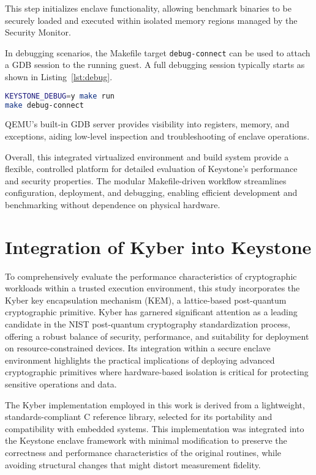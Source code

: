 This step initializes enclave functionality, allowing benchmark binaries to be securely loaded and executed within isolated memory regions managed by the Security Monitor.

In debugging scenarios, the Makefile target \texttt{debug-connect} can be used to attach a GDB session to the running guest. A full debugging session typically starts as shown in Listing~\ref{lst:debug}.

\begin{lstlisting}[language=bash, label={lst:debug}, caption={Starting a QEMU session with GDB debugging enabled}]
KEYSTONE_DEBUG=y make run
make debug-connect
\end{lstlisting}

QEMU’s built-in GDB server provides visibility into registers, memory, and exceptions, aiding low-level inspection and troubleshooting of enclave operations.

Overall, this integrated virtualized environment and build system provide a flexible, controlled platform for detailed evaluation of Keystone’s performance and security properties. The modular Makefile-driven workflow streamlines configuration, deployment, and debugging, enabling efficient development and benchmarking without dependence on physical hardware. %

\section{Integration of Kyber into Keystone}
\label{sec:kyber-enclave}

To comprehensively evaluate the performance characteristics of cryptographic workloads within a trusted execution environment, this study incorporates the Kyber key encapsulation mechanism (KEM), a lattice-based post-quantum cryptographic primitive. Kyber has garnered significant attention as a leading candidate in the NIST post-quantum cryptography standardization process, offering a robust balance of security, performance, and suitability for deployment on resource-constrained devices. Its integration within a secure enclave environment highlights the practical implications of deploying advanced cryptographic primitives where hardware-based isolation is critical for protecting sensitive operations and data.

The Kyber implementation employed in this work is derived from a lightweight, standards-compliant C reference library, selected for its portability and compatibility with embedded systems. This implementation was integrated into the Keystone enclave framework with minimal modification to preserve the correctness and performance characteristics of the original routines, while avoiding structural changes that might distort measurement fidelity. 

